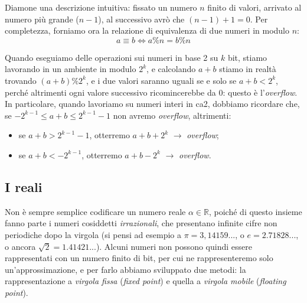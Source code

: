 \documentclass[class=book, crop=false, oneside]{standalone}
\begin{document}
Diamone una descrizione intuitiva: fissato un numero \(n\) finito di valori, arrivato al numero più grande (\(n-1\)), al successivo avrò che \((n-1)+1=0\). Per completezza, forniamo ora la relazione di equivalenza di due numeri in modulo \(n\):
\begin{equation*}
	a\equiv b \Longleftrightarrow a\%n=b\%n
\end{equation*}

Quando eseguiamo delle operazioni sui numeri in base 2 su \(k\) bit, stiamo lavorando in un ambiente in modulo \(2^{k}\), e calcolando \(a+b\) stiamo in realtà trovando \((a+b)\%2^{k}\), e i due valori saranno uguali se e solo se \(a+b<2^{k}\), perché altrimenti ogni valore successivo ricomincerebbe da 0: questo è l'\emph{overflow}. In particolare, quando lavoriamo su numeri interi in \acrshort{ca2}, dobbiamo ricordare che, se \(-2^{k-1}\le a+b\le 2^{k-1}-1\) non avremo \emph{overflow}, altrimenti:
\begin{itemize}
	\item se \(a+b>2^{k-1}-1\), otterremo \(a+b+2^{k}\) \(\longrightarrow\) \emph{overflow};
	\item se \(a+b<-2^{k-1}\), otterremo \(a+b-2^{k}\) \(\longrightarrow\) \emph{overflow}.
\end{itemize}

\subsection{I reali}
Non è sempre semplice codificare un numero reale \(\alpha \in \mathbb{R}\), poiché di questo insieme fanno parte i numeri cosiddetti \emph{irrazionali}, che presentano infinite cifre non periodiche dopo la virgola (si pensi ad esempio a \(\pi=3,14159...\), o \(e=2.71828...\), o ancora \(\sqrt{2}=1.41421...\)). Alcuni numeri non possono quindi essere rappresentati con un numero finito di bit, per cui ne rappresenteremo solo un'approssimazione, e per farlo abbiamo sviluppato due metodi: la rappresentazione a \emph{virgola fissa} (\emph{fixed point}) e quella a \emph{virgola mobile} (\emph{floating point}).
\end{document}
